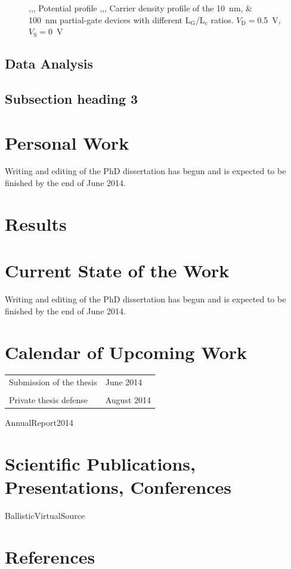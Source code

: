 \documentclass[11pt, a4paper]{article}
\newcommand{\sub}[1]{\ensuremath{_{\mathrm{#1}}}}
\newcommand{\nicefrac}[2]{#1\big/#2}
\newcommand{\Vd}{\ensuremath{V\sub{D}}}
\newcommand{\Vs}{\ensuremath{V\sub{S}}}
\begin{document}
\begin{figure}[b]
\begin{subfigure}{0.245\linewidth}
		\caption{}\label{fig:3:5b}
	\end{subfigure}
	\caption{,,, Potential
	profile ,,, Carrier density
	profile of the \SIlist{10;100}{\nm} partial-gate devices with different
	\nicefrac{L\sub{G}}{L\sub{c}} ratios.
	$\Vd=$\SI{0.5}{V}, $\Vs=$\SI{0}{V}}
	\label{fig:3:2}
\end{figure}%
    
\subsection{Data Analysis}
\blindtext

\subsection{Subsection heading 3}
\blindtext

\blindtext

\section{Personal Work}
Writing and editing of the PhD dissertation has begun and is expected to be finished by the end of
June 2014.

\section{Results}
\subsection{}

\section{Current State of the Work}
Writing and editing of the PhD dissertation has begun and is expected to be finished by the end of
June 2014.



\section{Calendar of Upcoming Work}
\begin{tabular}{p{}  l}
  Submission of the thesis & June 2014\\\\
  Private thesis defense & August 2014
\end{tabular}%

\newpage

\begin{btSect}[IEEEtranN]{AnnualReport2014}
\section{Scientific Publications, Presentations, Conferences}
\btPrintAll
\end{btSect}

\begin{btSect}[IEEEtran]{BallisticVirtualSource}
\section{References}
\btPrintAll
\end{btSect}
\end{document}
